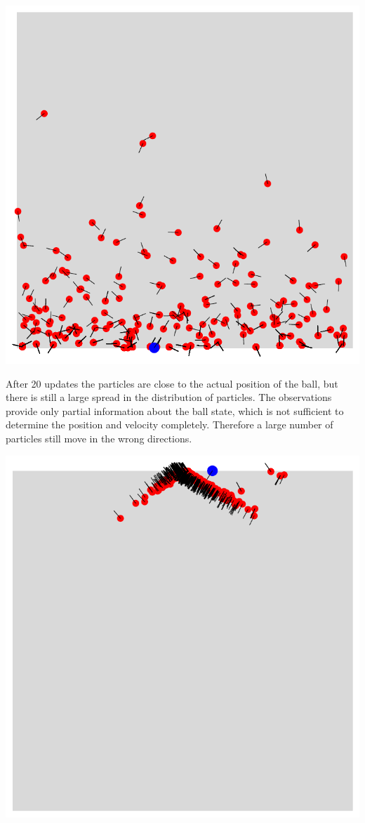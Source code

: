 \documentclass{tstextbook}
\begin{document}
\begin{example}
\includegraphics[scale=0.5, center]{images/particles_after_first_update.pdf}

After 20 updates the particles are close to the actual position of the ball, but there is still a large spread in the distribution of particles. The observations provide only partial information about the ball state, which is not sufficient to determine the position and velocity completely. Therefore a large number of particles still move in the wrong directions. 

\includegraphics[scale=0.5, center]{images/particles_after_20_updates.pdf}


\end{example}
\end{document}
